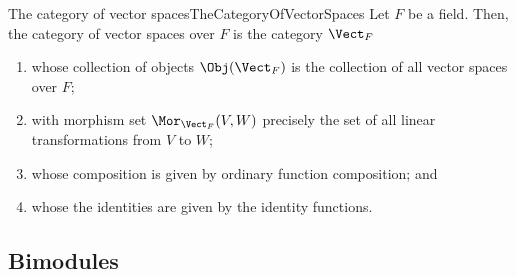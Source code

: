 \begin{exm}{The category of vector spaces}{TheCategoryOfVectorSpaces}
Let $F$ be a field.  Then, the category of vector spaces over $F$ is the category $\Vect _F$
\begin{enumerate}
\item whose collection of objects $\Obj (\Vect _F )$ is the collection of all vector spaces over $F$;
\item with morphism set $\Mor _{\Vect _F}(V,W)$ precisely the set of all linear transformations from $V$ to $W$;
\item whose composition is given by ordinary function composition; and
\item whose the identities are given by the identity functions.
\end{enumerate}
\end{exm}

\subsection{Bimodules}\label{sss1.1.2}

